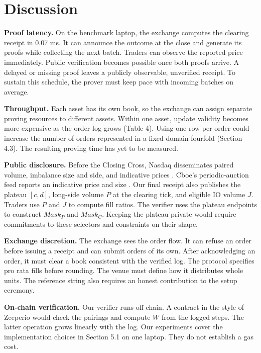 
\section{Discussion}

\textbf{Proof latency.} On the benchmark laptop, the exchange computes the clearing receipt in 0.07 ms. It can announce the outcome at the close and generate its proofs while collecting the next batch. Traders can observe the reported price immediately. Public verification becomes possible once both proofs arrive. A delayed or missing proof leaves a publicly observable, unverified receipt. To sustain this schedule, the prover must keep pace with incoming batches on average.

\textbf{Throughput.} Each asset has its own book, so the exchange can assign separate proving resources to different assets. Within one asset, update validity becomes more expensive as the order log grows (Table 4). Using one row per order could increase the number of orders represented in a fixed domain fourfold (Section 4.3). The resulting proving time has yet to be measured.

\textbf{Public disclosure.} Before the Closing Cross, Nasdaq disseminates paired volume, imbalance size and side, and indicative prices \cite{itch,nasdaq4754}. Cboe's periodic-auction feed reports an indicative price and size \cite{cboepitch}. Our final receipt also publishes the plateau \([c,d]\), long-side volume \(P\) at the clearing tick, and eligible IO volume \(J\). Traders use \(P\) and \(J\) to compute fill ratios. The verifier uses the plateau endpoints to construct \(Mask_P\) and \(Mask_C\). Keeping the plateau private would require commitments to these selectors and constraints on their shape.

\textbf{Exchange discretion.} The exchange sees the order flow. It can refuse an order before issuing a receipt and can submit orders of its own. After acknowledging an order, it must clear a book consistent with the verified log. The protocol specifies pro rata fills before rounding. The venue must define how it distributes whole units. The reference string also requires an honest contribution to the setup ceremony.

\textbf{On-chain verification.} Our verifier runs off chain. A contract in the style of Zeeperio \cite{zeeperio2026} would check the pairings and compute \(W\) from the logged steps. The latter operation grows linearly with the log. Our experiments cover the implementation choices in Section 5.1 on one laptop. They do not establish a gas cost.

